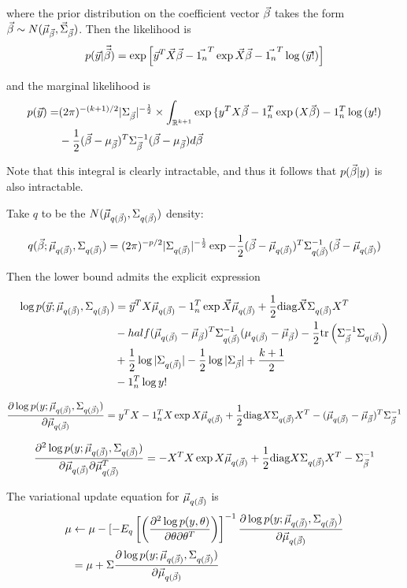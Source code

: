 \documentclass{amsart}
\begin{document}
where the prior distribution on the coefficient vector $\vec{\beta}$ takes the form
$\vec{\beta} \sim N(\vec{\mu}_{\vec{\beta}}, \vec{\Sigma}_{\vec{\beta}})$. Then the
likelihood is
\[
p(\vec{y}|\vec{\vec{\beta}}) = \exp{\left [ \vec{y}^T \vec{X}\vec{\beta}- \vec{1_n}^T \exp{\vec{X}\vec{\beta}} - \vec{1_n}^T \log{(\vec{y}!)} \right ]}
\]

and the marginal likelihood is
\begin{align*}
p(\vec{y}) =& (2 \pi)^{-(k+1)/2} | \Sigma_{\vec{\beta}}|^{-\frac{1}{2}} \times 
	\int_{\mathbb{R}^{k+1}} \exp{\{ y^T X\vec{\beta}- 1_n^T \exp{(X \vec{\beta})} - 1_n ^T \log{(y!)}} \\
		&- \frac{1}{2} (\vec{\beta} - \mu_{\vec{\beta}})^T \Sigma_{\vec{\beta}}^{-1} (\vec{\beta} - \mu_{\vec{\beta}}) d \vec{\beta}
\end{align*}

Note that this integral is clearly intractable, and thus it follows that $p(\vec{\beta}|y)$ is
also intractable.

Take $q$ to be the $N(\vec{\mu}_{q(\vec{\beta})}, \Sigma_{q(\vec{\beta})})$ density:

\[
q(\vec{\beta}; \vec{\mu}_{q(\vec{\beta})}, \Sigma_{q(\vec{\beta})}) = (2 \pi)^{-p/2} | \Sigma_{q(\vec{\beta})} |^{-\frac{1}{2}}
	\exp{ -\frac{1}{2}(\vec{\beta}- \vec{\mu}_{q(\vec{\beta})})^T \Sigma_{q(\vec{\beta})}^{-1} (\vec{\beta}- \vec{\mu}_{q(\vec{\beta})}) }
\]

Then the lower bound admits the explicit expression

\begin{align*}
\log{p(\vec{y};\vec{\mu}_{q(\vec{\beta})}, \Sigma_{q(\vec{\beta})})} &= \vec{y}^T X \vec{\mu}_{q(\vec{\beta})} -
	1_n^T \exp{\vec{X}\vec{\mu}_{q(\vec{\beta})}} + \frac{1}{2} {\mbox{diag}}{\vec{X} \Sigma_{q(\vec{\beta})} X^T} \\
&-half (\vec{\mu}_{q(\vec{\beta})} - \vec{\mu}_{\vec{\beta}})^T \Sigma_{q(\vec{\beta})}^{-1} (\mu_{q(\vec{\beta})} - \vec{\mu}_{\vec{\beta}}) -\frac{1}{2} \text{tr}\left( \Sigma_{\vec{\beta}}^{-1} \Sigma_{q(\vec{\beta})} \right)\\
& + \frac{1}{2} \log{|\Sigma_{q(\vec{\beta})}|} - \frac{1}{2} \log{|\Sigma_{\vec{\beta}}|} + \frac{k + 1}{2}\\
& -1_n^T \log{y!}
\end{align*}

$$
\frac{\partial \log{ p(y; \vec{\mu}_{q(\vec{\beta})}, \Sigma_{q(\vec{\beta})})}}{\partial \vec{\mu}_{q(\vec{\beta})}} = y^T X - 1_n^T X \exp{X \vec{\mu}_{q(\vec{\beta})}+ \frac{1}{2}{\mbox{diag}}{X \Sigma_{q(\vec{\beta})}X^T}} - (\vec{\mu}_{q(\vec{\beta})} -\vec{\mu}_{\vec{\beta}})^T \Sigma_{\vec{\beta}}^{-1}
$$

$$
\frac{\partial^2 \log{ p(y; \vec{\mu}_{q(\vec{\beta})}, \Sigma_{q(\vec{\beta})})}}{\partial \vec{\mu}_{q(\vec{\beta})} \partial \vec{\mu}_{q(\vec{\beta})}^T} = - X^T X \exp{X \vec{\mu}_{q(\vec{\beta})}+ \frac{1}{2}{\mbox{diag}}{X \Sigma_{q(\vec{\beta})}X^T}} - \Sigma_{\vec{\beta}}^{-1}
$$

The variational update equation for $\vec{\mu}_{q(\vec{\beta})}$ is
\begin{align*}
\mu &\leftarrow \mu - [-E_q \left [  \left (\frac{\partial^2 \log{ p(y, \theta)}}{\partial \theta \partial \theta^T} \right ) \right ]^{-1}\frac{\partial \log{ p(y; \vec{\mu}_{q(\vec{\beta})}, \Sigma_{q(\vec{\beta})})}}{\partial \vec{\mu}_{q(\vec{\beta})}}\\
&= \mu + \Sigma \frac{\partial \log{ p(y; \vec{\mu}_{q(\vec{\beta})}, \Sigma_{q(\vec{\beta})})}}{\partial \vec{\mu}_{q(\vec{\beta})}}
\end{align*}
\end{document}
